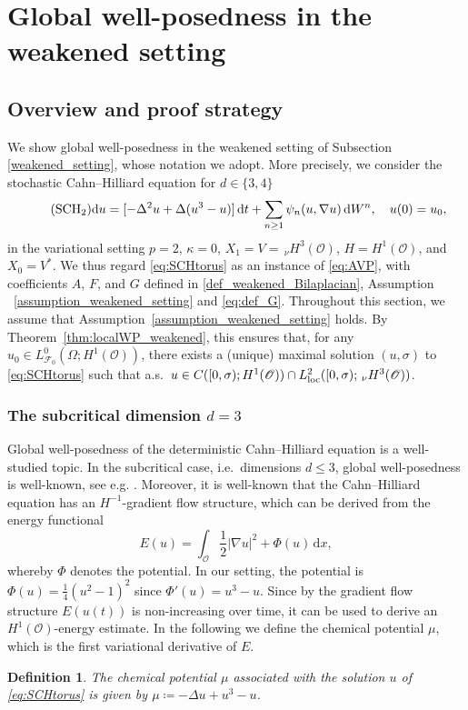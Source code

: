 \documentclass[reqno]{amsart}
\newtheorem{definition}[Satz]{Definition}
\newcommand{\F}{\mathscr{F}}
\newcommand{\sO}{\mathscr{O}}
\newcommand{\ce}{\coloneqq}
\newcommand{\1}{\mathbf{1}}
\newcommand{\grad}{\nabla}
\newcommand{\rmd}{\mathrm{d}}
\newcommand{\dt}{\,\mathrm{d}t}
\newcommand{\dx}{\,\mathrm{d}x}
\newcommand{\loc}{\textup{loc}}
\newcommand{\nH}{\ensuremath{\,_\nu H}}
\begin{document}
\section{Global well-posedness in the weakened setting}
\label{sec:globalWP}

\subsection{Overview and proof strategy}
\label{subsec:overviewglobalWP} We show global well-posedness in the weakened setting of Subsection
\ref{weakened_setting}, whose notation we adopt. More precisely, we consider the stochastic Cahn--Hilliard equation for $d\in\{3,4\}$
\begin{equation}\tag{$\text{SCH}_2$}
\label{eq:SCHtorus}
    \rmd u = [-\Delta^2u+\Delta(u^3-u)
    ]\dt + \sum_{n \geq 1} \psi_n(u,\grad u)\,\rmd W^n,\quad u(0)=u_0,
\end{equation}
in the variational setting $p=2$, $\kappa=0$, $X_1 = V = \nH^3(\sO)$, $H=H^1(\sO)$, and $X_0 = V^*$. We thus regard \eqref{eq:SCHtorus} as an instance of \eqref{eq:AVP}, with coefficients $A$, $F$, and $G$ defined in \eqref{def_weakened_Bilaplacian}, Assumption ~\ref{assumption_weakened_setting} and \eqref{eq:def_G}. Throughout this section, we assume that Assumption~\ref{assumption_weakened_setting} holds. By Theorem~\ref{thm:localWP_weakened}, this ensures that, for any $u_0\in L^0_{\F_0}(\Omega;H^1(\sO))$, there exists a (unique) maximal solution $(u,\sigma)$ to \eqref{eq:SCHtorus} such that a.s.\ $u\in C([0,\sigma);H^1(\sO))\cap L^2_{\loc}([0,\sigma);\nH^3(\sO))$.


\subsubsection{The subcritical dimension \texorpdfstring{$d=3$}{d=3}}
\label{subsec:overviewglobalWPd3}

 Global well-posedness of the deterministic
Cahn--Hilliard equation is a well-studied topic. In the subcritical case, i.e.\
dimensions $d\le 3$, global well-posedness is well-known, see e.g.
\cite{ElliottSongmu86}. Moreover, it is well-known that the Cahn--Hilliard
equation has an $H^{-1}$-gradient flow structure, which can be derived from the
energy functional
    \begin{equation*}
        E(u)= \int_{\sO}\frac{1}{2}|\grad u|^2 + \Phi(u) \dx,
    \end{equation*}
    whereby $\Phi$ denotes the potential. In our setting, the potential is $\Phi(u) =
\frac{1}{4}(u^2-1)^2$ since $\Phi'(u) = u^3-u$. Since by the gradient flow
structure $E(u(t))$ is non-increasing over time, it can be used to derive an
$H^1(\sO)$-energy estimate. In the
following we define the chemical potential $\mu$, which is the first variational
derivative of $E$.
    \begin{definition}\label{def:chemPotential}
    The \emph{chemical potential} $\mu$ associated with the solution $u$ of
\eqref{eq:SCHtorus} is given by $\mu\ce -\Delta u+u^3-u$.
    \end{definition}
\end{document}
